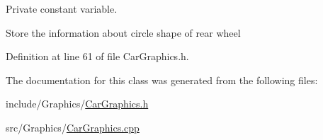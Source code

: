 Private constant variable. 

Store the information about circle shape of rear wheel 

Definition at line 61 of file Car\+Graphics.\+h.



The documentation for this class was generated from the following files\+:\begin{DoxyCompactItemize}
\item 
include/\+Graphics/\hyperlink{CarGraphics_8h}{Car\+Graphics.\+h}\item 
src/\+Graphics/\hyperlink{CarGraphics_8cpp}{Car\+Graphics.\+cpp}\end{DoxyCompactItemize}
